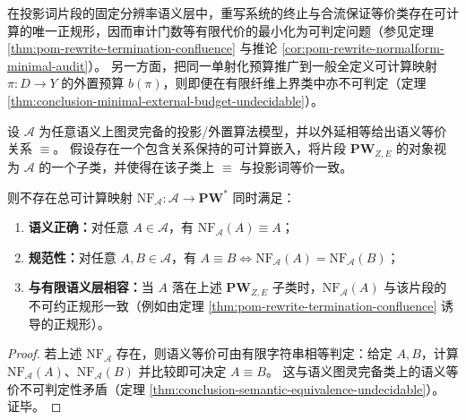 \begin{corollary}[有限语义层的正规形最小化与图灵层预算最小化的分界]\label{cor:pom-normalform-vs-turing-budget-undecidable}
在投影词片段的固定分辨率语义层中，重写系统的终止与合流保证等价类存在可计算的唯一正规形，因而审计门数等有限代价的最小化为可判定问题（参见定理 \ref{thm:pom-rewrite-termination-confluence} 与推论 \ref{cor:pom-rewrite-normalform-minimal-audit}）。
另一方面，把同一单射化预算推广到一般全定义可计算映射 \(\pi:D\to Y\) 的外置预算 \(b(\pi)\)，则即便在有限纤维上界类中亦不可判定（定理 \ref{thm:conclusion-minimal-external-budget-undecidable}）。
\end{corollary}

\begin{theorem}[语义图灵完备类上不存在可计算的实现无关规范代表]\label{thm:pom-no-global-computable-canonical-representative}
设 \(\mathcal A\) 为任意语义上图灵完备的投影/外置算法模型，并以外延相等给出语义等价关系 \(\equiv\)。
假设存在一个包含关系保持的可计算嵌入，将片段 \(\mathbf{PW}_{Z,E}\) 的对象视为 \(\mathcal A\) 的一个子类，并使得在该子类上 \(\equiv\) 与投影词等价一致。
\par
则不存在总可计算映射 \(\mathrm{NF}_{\mathcal A}:\mathcal A\to \mathbf{PW}^\ast\) 同时满足：
\begin{enumerate}
  \item \textbf{语义正确：}对任意 \(A\in\mathcal A\)，有 \(\mathrm{NF}_{\mathcal A}(A)\equiv A\)；
  \item \textbf{规范性：}对任意 \(A,B\in\mathcal A\)，有 \(A\equiv B\iff \mathrm{NF}_{\mathcal A}(A)=\mathrm{NF}_{\mathcal A}(B)\)；
  \item \textbf{与有限语义层相容：}当 \(A\) 落在上述 \(\mathbf{PW}_{Z,E}\) 子类时，\(\mathrm{NF}_{\mathcal A}(A)\) 与该片段的不可约正规形一致（例如由定理 \ref{thm:pom-rewrite-termination-confluence} 诱导的正规形）。
\end{enumerate}
\end{theorem}
\begin{proof}
若上述 \(\mathrm{NF}_{\mathcal A}\) 存在，则语义等价可由有限字符串相等判定：给定 \(A,B\)，计算 \(\mathrm{NF}_{\mathcal A}(A)\)、\(\mathrm{NF}_{\mathcal A}(B)\) 并比较即可决定 \(A\equiv B\)。
这与语义图灵完备类上的语义等价不可判定性矛盾（定理 \ref{thm:conclusion-semantic-equivalence-undecidable}）。
证毕。
\end{proof}

